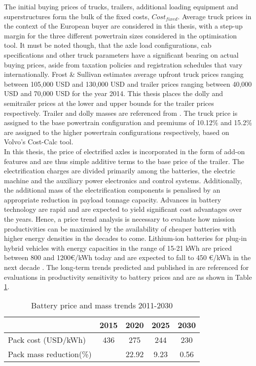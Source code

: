 \documentclass[ExampleMasters.tex]{subfiles}
\begin{document}
		The initial buying prices of trucks, trailers, additional loading equipment and superstructures form the bulk of the fixed costs, $Cost_{fixed}$. Average truck prices in the context of the European buyer are considered in this thesis, with a step-up margin for the three different powertrain sizes considered in the optimisation tool. It must be noted though, that the axle load configurations, cab specifications and other truck parameters have a significant bearing on actual buying prices, aside from taxation policies and registration schedules that vary internationally. Frost \& Sullivan \cite{FrostSullivan} estimates average upfront truck prices ranging between 105,000 USD and 130,000 USD and trailer prices ranging between 40,000 USD and 70,000 USD for the year 2014. This thesis places the dolly and semitrailer prices at the lower and upper bounds for the trailer prices respectively. Trailer and dolly masses are referenced from \cite{VehCombAurell}. The truck price is assigned to the base powertrain configuration and premiums of 10.12\% and 15.2\% are assigned to the higher powertrain configurations respectively, based on Volvo's Cost-Calc tool.\\

		In this thesis, the price of electrified axles is incorporated in the form of add-on features and are thus simple additive terms to the base price of the trailer. The electrification charges are divided primarily among the batteries, the electric machine and the auxiliary power electronics and control systems. Additionally, the additional mass of the electrification components is penalised by an appropriate reduction in payload tonnage capacity. Advances in battery technology are rapid and are expected to yield significant cost advantages over the years. Hence, a price trend analysis is necessary to evaluate how mission productivities can be maximised by the availability of cheaper batteries with higher energy densities in the decades to come. Lithium-ion batteries for plug-in hybrid vehicles with energy capacities in the range of 15-21 kWh are priced between 800 and 1200\euro /kWh today \cite{EUROBAT} and are expected to fall to 450 \euro /kWh in the next decade \cite{EUROBAT}. The long-term trends predicted and published in \cite[T.~8-16]{ElementEnergy} are referenced for evaluations in productivity sensitivity to battery prices and are as shown in Table \ref{table:batteryPriceMassTrend}.\\

		\begin{table}[ht]
			\centering 
			\begin{tabular}{l c c c c}
				\cline{2-5}
				\  & 2015 & 2020 & 2025 & 2030\\ 
				\hline
			    Pack cost (USD/kWh)  & 436 & 275 & 244 & 230\\
			    Pack mass reduction(\%)  &  & 22.92  & 9.23 & 0.56\\
				\hline 
			\end{tabular}
			\caption{Battery price and mass trends 2011-2030 \cite{ElementEnergy}} 
			\label{table:batteryPriceMassTrend} 
		\end{table}
\end{document}
